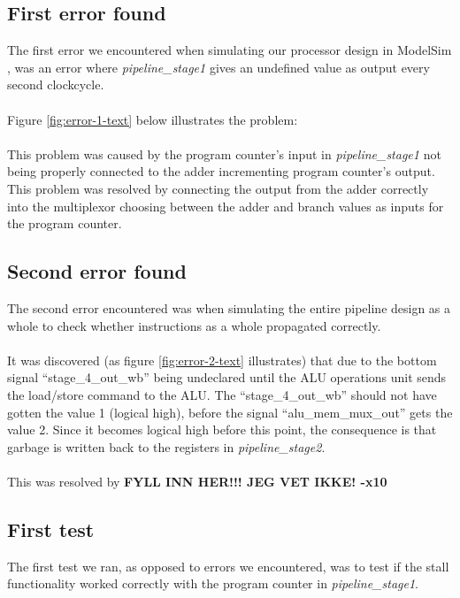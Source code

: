 \subsection{First error found}
The first error we encountered when simulating our processor design in ModelSim
\cite{modelsim}, was an error where \emph{pipeline\_stage1} gives an undefined
value as output every second clockcycle.
\paragraph*{}
Figure \ref{fig:error-1-text} below illustrates the problem:

\paragraph*{}
This problem was caused by the program counter's input in
\emph{pipeline\_stage1} not being properly connected to the adder incrementing
program counter's output. This problem was resolved by connecting the output
from the adder correctly into the multiplexor choosing between the adder and
branch values as inputs for the program counter.

\subsection{Second error found}
The second error encountered was when simulating the entire pipeline design as
a whole to check whether instructions as a whole propagated correctly.
\paragraph*{}
It was discovered (as figure \ref{fig:error-2-text} illustrates) that due to the
bottom signal ``stage\_4\_out\_wb'' being undeclared until the ALU operations unit
sends the load/store command to the ALU. The ``stage\_4\_out\_wb'' should not
have gotten the value 1 (logical high), before the signal ``alu\_mem\_mux\_out''
gets the value 2. Since it becomes logical high before this point, the
consequence is that garbage is written back to the registers in
\emph{pipeline\_stage2}.

\paragraph*{}
This was resolved by\newline
\textbf{FYLL INN HER!!! JEG VET IKKE! -x10}

\subsection{First test}

The first test we ran, as opposed to errors we encountered, was to test if the
stall functionality worked correctly with the program counter in \emph{
pipeline\_stage1}.
